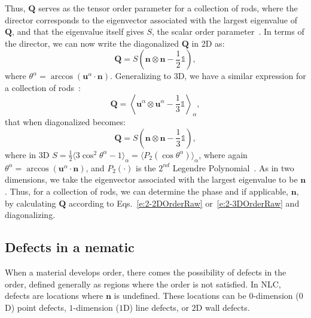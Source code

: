 Thus, $\mathbf{Q}$ serves as the tensor order parameter for a collection of rods, where the director corresponds to the eigenvector associated with the largest eigenvalue of $\mathbf{Q}$, and that the eigenvalue itself gives $S$, the scalar order parameter~\cite{RN33,RN175}.
In terms of the director, we can now write the diagonalized $\mathbf{Q}$ in 2D as:
\begin{equation}
  \mathbf{Q} = S \left ( \mathbf{n} \otimes \mathbf{n} - \frac{1}{2}\mathbb{1} \right ),\label{e:2-2DOrderDiag}
\end{equation}
where $\theta^{\alpha} = \arccos (\mathbf{u}^{\alpha} \cdot \mathbf{n})$.
Generalizing to 3D, we have a similar expression for a collection of rods~\cite{RN33}:
\begin{equation}
  \mathbf{Q} =  \left \langle \mathbf{u}^{\alpha} \otimes \mathbf{u}^{\alpha} - \frac{1}{3} \mathbb{1} \right \rangle_{\alpha},\label{e:2-3DOrderRaw}
\end{equation}
that when diagonalized becomes:
\begin{equation}
  \mathbf{Q} = S \left ( \mathbf{n} \otimes \mathbf{n} - \frac{1}{3}\mathbb{1} \right ),\label{e:2-3DOrderDiag}
\end{equation}
where in 3D $S = \frac{1}{2} \big \langle 3 \cos^2 \theta^{\alpha}  - 1 \big  \rangle_{\alpha} = \big \langle P_2(\cos \theta^{\alpha}) \big \rangle_{\alpha} $,
where again $\theta^{\alpha} = \arccos (\mathbf{u}^{\alpha} \cdot \mathbf{n})$, and $P_2(\cdot)$ is the $2^{nd}$ Legendre Polynomial~\cite{RN33,RN175}.
As in two dimensions, we take the eigenvector associated with the largest eigenvalue to be $\mathbf{n}$.
Thus, for a collection of rods, we can determine the phase and if applicable, $\mathbf{n}$, by calculating $\mathbf{Q}$ according to Eqs.~\ref{e:2-2DOrderRaw} or~\ref{e:2-3DOrderRaw} and diagonalizing.


\subsection{Defects in a nematic}
When a material develops order, there comes the possibility of defects in the order, defined generally as regions where the order is not satisfied.
In NLC, defects are locations where $\mathbf{n}$ is undefined.
These locations can be $0$-dimension ($0$D) point defects, $1$-dimension ($1$D) line defects, or $2$D wall defects. \\

